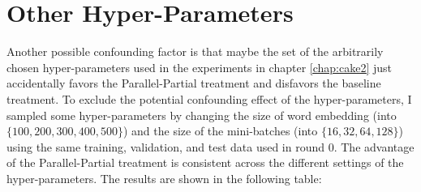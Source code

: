 \documentclass[final]{ua-thesis}
\numberwithin{equation}{section}
\begin{document}
\section{Other Hyper-Parameters}
Another possible confounding factor is that maybe the set of the arbitrarily chosen hyper-parameters used in the experiments in chapter \ref{chap:cake2} just accidentally favors the Parallel-Partial treatment and disfavors the baseline treatment. To exclude the potential confounding effect of the hyper-parameters, I sampled some hyper-parameters by changing the size of word embedding (into $\{100, 200, 300, 400, 500\}$) and the size of the mini-batches (into $\{16, 32, 64, 128\}$) using the same training, validation, and test data used in round 0. The advantage of the Parallel-Partial treatment is consistent across the different settings of the hyper-parameters. The results are shown in the following table:  
\end{document}

